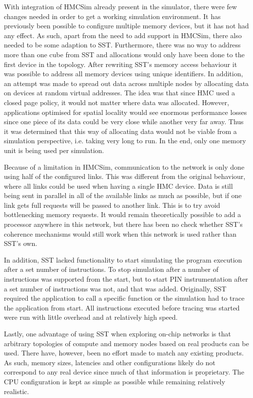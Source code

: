 With integration of HMCSim already present in the simulator, there were few changes needed in order to get a working simulation environment. It has previously been possible to configure multiple memory devices, but it has not had any effect. As such, apart from the need to add support in HMCSim, there also needed to be some adaption to SST. Furthermore, there was no way to address more than one cube from SST and allocations would only have been done to the first device in the topology. After rewriting SST's memory access behaviour it was possible to address all memory devices using unique identifiers. In addition, an attempt was made to spread out data across multiple nodes by allocating data on devices at random virtual addresses. The idea was that since HMC used a closed page policy, it would not matter where data was allocated. However, applications optimised for spatial locality would see enormous performance losses since one piece of its data could be very close while another very far away. Thus it was determined that this way of allocating data would not be viable from a simulation perspective, i.e. taking very long to run. In the end, only one memory unit is being used per simulation.
\bigskip

Because of a limitation in HMCSim, communication to the network is only done using half of the configured links. This was different from the original behaviour, where all links could be used when having a single HMC device. Data is still being sent in parallel in all of the available links as much as possible, but if one link gets full requests will be passed to another link. This is to try avoid bottlenecking memory requests. It would remain theoretically possible to add a processor anywhere in this network, but there has been no check whether SST's coherence mechanisms would still work when this network is used rather than SST's own. 
\bigskip

In addition, SST lacked functionality to start simulating the program execution after a set number of instructions. To stop simulation after a number of instructions was supported from the start, but to start PIN instrumentation after a set number of instructions was not, and that was added. Originally, SST required the application to call a specific function or the simulation had to trace the application from start. All instructions executed before tracing was started were run with little overhead and at relatively high speed.
\bigskip

Lastly, one advantage of using SST when exploring on-chip networks is that arbitrary topologies of compute and memory nodes based on real products can be used. There have, however, been no effort made to match any existing products. As such, memory sizes, latencies and other configurations likely do not correspond to any real device since much of that information is proprietary. The CPU configuration is kept as simple as possible while remaining relatively realistic.

